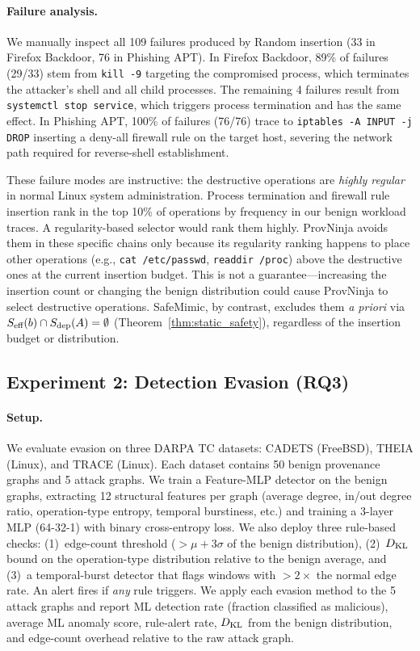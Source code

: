 \paragraph{Failure analysis.}
We manually inspect all 109 failures produced by Random insertion (33 in Firefox Backdoor, 76 in Phishing APT).
In Firefox Backdoor, 89\% of failures (29/33) stem from \texttt{kill -9} targeting the compromised process, which terminates the attacker's shell and all child processes.
The remaining 4 failures result from \texttt{systemctl stop \textlangle service\textrangle}, which triggers process termination and has the same effect.
In Phishing APT, 100\% of failures (76/76) trace to \texttt{iptables -A INPUT -j DROP} inserting a deny-all firewall rule on the target host, severing the network path required for reverse-shell establishment.

These failure modes are instructive: the destructive operations are \emph{highly regular} in normal Linux system administration.
Process termination and firewall rule insertion rank in the top 10\% of operations by frequency in our benign workload traces.
A regularity-based selector would rank them highly.
ProvNinja avoids them in these specific chains only because its regularity ranking happens to place other operations (e.g., \texttt{cat /etc/passwd}, \texttt{readdir /proc}) above the destructive ones at the current insertion budget.
This is not a guarantee---increasing the insertion count or changing the benign distribution could cause ProvNinja to select destructive operations.
SafeMimic, by contrast, excludes them \emph{a priori} via $S_{\text{eff}}(b) \cap S_{\text{dep}}(A) = \emptyset$ (Theorem~\ref{thm:static_safety}), regardless of the insertion budget or distribution.

\subsection{Experiment 2: Detection Evasion (RQ3)}
\label{sec:eval:evasion}

\paragraph{Setup.}
We evaluate evasion on three DARPA TC datasets: CADETS (FreeBSD), THEIA (Linux), and TRACE (Linux).
Each dataset contains 50 benign provenance graphs and 5 attack graphs.
We train a Feature-MLP detector on the benign graphs, extracting 12 structural features per graph (average degree, in/out degree ratio, operation-type entropy, temporal burstiness, etc.) and training a 3-layer MLP (64-32-1) with binary cross-entropy loss.
We also deploy three rule-based checks:
(1)~edge-count threshold ($>\mu + 3\sigma$ of the benign distribution),
(2)~$D_{\text{KL}}$ bound on the operation-type distribution relative to the benign average, and
(3)~a temporal-burst detector that flags windows with $>2\times$ the normal edge rate.
An alert fires if \emph{any} rule triggers.
We apply each evasion method to the 5 attack graphs and report ML detection rate (fraction classified as malicious), average ML anomaly score, rule-alert rate, $D_{\text{KL}}$ from the benign distribution, and edge-count overhead relative to the raw attack graph.

